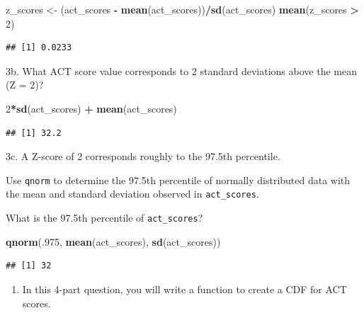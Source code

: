 \documentclass[
]{article}
\newenvironment{Shaded}{\begin{snugshade}}{\end{snugshade}}
\newcommand{\DecValTok}[1]{\textcolor[rgb]{0.00,0.00,0.81}{#1}}
\newcommand{\KeywordTok}[1]{\textcolor[rgb]{0.13,0.29,0.53}{\textbf{#1}}}
\newcommand{\NormalTok}[1]{#1}
\newcommand{\OperatorTok}[1]{\textcolor[rgb]{0.81,0.36,0.00}{\textbf{#1}}}
\newcommand{\StringTok}[1]{\textcolor[rgb]{0.31,0.60,0.02}{#1}}
\providecommand{\tightlist}{%
  \setlength{\itemsep}{0pt}\setlength{\parskip}{0pt}}
\begin{document}
\begin{Shaded}
\begin{Highlighting}[]
\NormalTok{z\_scores \textless{}{-}}\StringTok{ }\NormalTok{(act\_scores }\OperatorTok{{-}}\StringTok{ }\KeywordTok{mean}\NormalTok{(act\_scores))}\OperatorTok{/}\KeywordTok{sd}\NormalTok{(act\_scores)}
\KeywordTok{mean}\NormalTok{(z\_scores }\OperatorTok{\textgreater{}}\StringTok{ }\DecValTok{2}\NormalTok{)}
\end{Highlighting}
\end{Shaded}

\begin{verbatim}
## [1] 0.0233
\end{verbatim}

3b. What ACT score value corresponds to 2 standard deviations above the
mean (Z = 2)?

\begin{Shaded}
\begin{Highlighting}[]
\DecValTok{2}\OperatorTok{*}\KeywordTok{sd}\NormalTok{(act\_scores) }\OperatorTok{+}\StringTok{ }\KeywordTok{mean}\NormalTok{(act\_scores)}
\end{Highlighting}
\end{Shaded}

\begin{verbatim}
## [1] 32.2
\end{verbatim}

3c. A Z-score of 2 corresponds roughly to the 97.5th percentile.

Use \texttt{qnorm} to determine the 97.5th percentile of normally
distributed data with the mean and standard deviation observed in
\texttt{act\_scores}.

What is the 97.5th percentile of \texttt{act\_scores}?

\begin{Shaded}
\begin{Highlighting}[]
\KeywordTok{qnorm}\NormalTok{(.}\DecValTok{975}\NormalTok{, }\KeywordTok{mean}\NormalTok{(act\_scores), }\KeywordTok{sd}\NormalTok{(act\_scores))}
\end{Highlighting}
\end{Shaded}

\begin{verbatim}
## [1] 32
\end{verbatim}

\begin{enumerate}
\def\labelenumi{\arabic{enumi}.}
\setcounter{enumi}{3}
\tightlist
\item
  In this 4-part question, you will write a function to create a CDF for
  ACT scores.
\end{enumerate}
\end{document}
